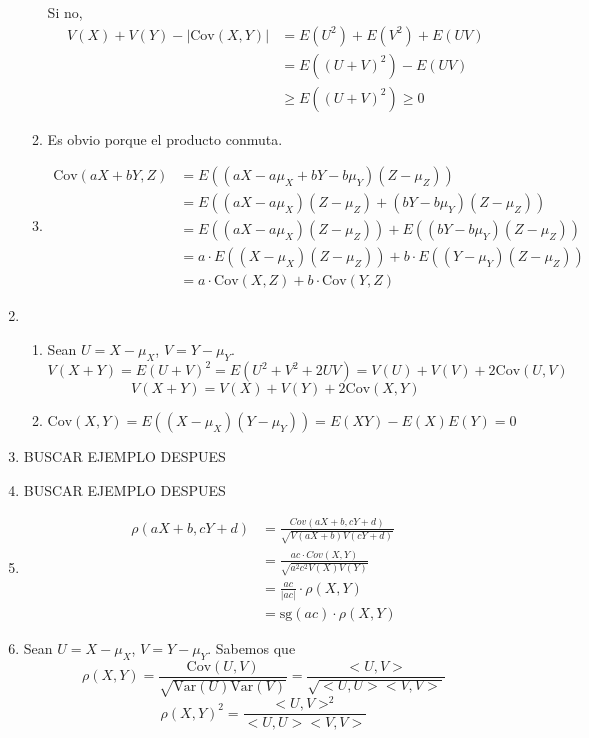 \begin{enumerate}
\begin{enumerate}
				Si no,
				\begin{align*}
				V(X) + V(Y) - |\text{Cov}(X,Y)|	& = E(U^2) + E(V^2) + E(UV)	\\
												& = E((U+V)^2) - E(UV)		\\
												& \geq E((U+V)^2) \geq 0
				\end{align*}
				
			\item Es obvio porque el producto conmuta.
				
			\item
				\begin{align*}
					\text{Cov}(aX+bY, Z)	& = E((aX - a\mu_X + bY - b\mu_Y)(Z-\mu_Z))					\\
											& = E((aX - a\mu_X)(Z-\mu_Z) + (bY - b\mu_Y)(Z-\mu_Z))		\\
											& = E((aX - a\mu_X)(Z-\mu_Z)) + E((bY - b\mu_Y)(Z-\mu_Z))	\\
											& = a\cdot E((X - \mu_X)(Z-\mu_Z)) + b\cdot E((Y - \mu_Y)(Z-\mu_Z))	\\
											& = a\cdot \text{Cov}(X, Z) + b\cdot \text{Cov}(Y, Z)
				\end{align*}
		\end{enumerate}
		
	\item
		\begin{enumerate}
			\item Sean $U=X-\mu_X$, $V=Y-\mu_Y$.
				$$V(X+Y) = E(U+V)^2 = E(U^2 + V^2 +2UV) = V(U) + V(V) + 2\text{Cov}(U,V)$$
				$$V(X+Y) = V(X) + V(Y) + 2\text{Cov}(X,Y)$$
			\item
				$$\text{Cov}(X,Y) = E((X-\mu_X)(Y-\mu_Y)) = E(XY) - E(X)E(Y) = 0$$
		\end{enumerate}
	
	\item
		BUSCAR EJEMPLO DESPUES
	\item
		BUSCAR EJEMPLO DESPUES
		
	\item
		\begin{align*}
			\rho(aX+b, cY+d)	& = \frac{Cov(aX+b, cY+d)}{\sqrt{V(aX+b)V(cY+d)}}	\\
								& = \frac{ac\cdot Cov(X,Y)}{\sqrt{a^2c^2V(X)V(Y)}}	\\
								& = \frac{ac}{|ac|}\cdot{\rho(X,Y)}					\\
								& = \text{sg}(ac)\cdot{\rho(X,Y)}
		\end{align*}
		
	\item
		Sean $U=X-\mu_X$, $V=Y-\mu_Y$. Sabemos que
			$$\rho(X,Y) = \frac{\text{Cov}(U,V)}{\sqrt{\text{Var}(U)\text{Var}(V)}} = \frac{<U,V>}{\sqrt{<U,U><V,V>}}$$
			$$\rho(X,Y)^2 = \frac{<U,V>^2}{<U,U><V,V>}$$
			

\end{enumerate}
